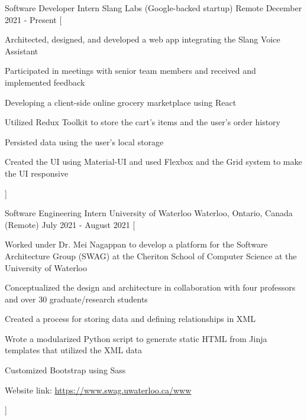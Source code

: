 

\begin{cventries}

  \cventry
    {Software Developer Intern} %
    {Slang Labs (Google-backed startup)} %
    {Remote} %
    {December 2021 - Present} %
    [
      \begin{cvitems} %
        \item {Architected, designed, and developed a web app integrating the Slang Voice Assistant}
        \item {Participated in meetings with senior team members and received and implemented feedback}
        \item {Developing a client-side online grocery marketplace using React}
        \item {Utilized Redux Toolkit to store the cart's items and the user's order history}
        \item {Persisted data using the user's local storage}
        \item {Created the UI using Material-UI and used Flexbox and the Grid system to make the UI responsive}
      \end{cvitems}
    ]

  \cventry
    {Software Engineering Intern} %
    {University of Waterloo} %
    {Waterloo, Ontario, Canada (Remote)} %
    {July 2021 - August 2021} %
    [
      \begin{cvitems} %
        \item {Worked under Dr. Mei Nagappan to develop a platform for the Software Architecture Group (SWAG) at the Cheriton School of Computer Science at the University of Waterloo}
        \item {Conceptualized the design and architecture in collaboration with four professors and over 30 graduate/research students}
        \item {Created a process for storing data and defining relationships in XML}
        \item {Wrote a modularized Python script to generate static HTML from Jinja templates that utilized the XML data}
        \item {Customized Bootstrap using Sass}
        \item {Website link: \href{https://www.swag.uwaterloo.ca/www}{https://www.swag.uwaterloo.ca/www}}
      \end{cvitems}
    ]


\end{cventries}
